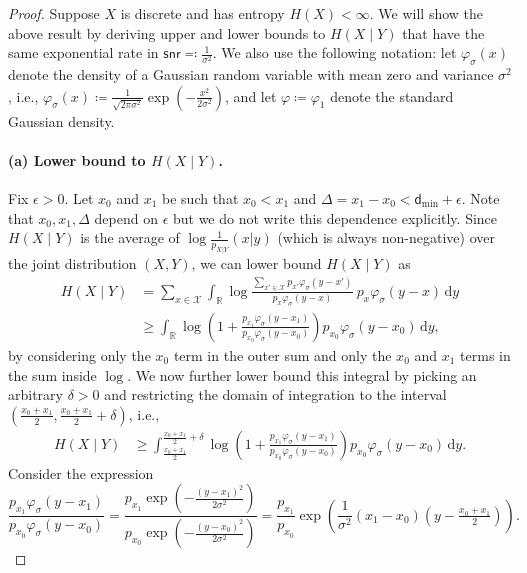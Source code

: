 \documentclass[10pt,a4paper]{amsart}
\newcommand{\bbR}{\mathbb{R}}
\newcommand{\calX}{\mathcal{X}}
\newcommand{\dmin}{\mathsf{d}_{\min}}
\newcommand{\intR}{\int_{\bbR}}
\newcommand{\snr}{\mathsf{snr}}
\renewcommand{\d}{\,\mathrm{d}}
\begin{document}
	\begin{proof}[Proof]
		Suppose $X$ is discrete and has entropy $H(X) < \infty$. We will show the above result by deriving upper and lower bounds to $H(X \mid Y)$ that have the same exponential rate in $\snr \eqqcolon \frac{1}{\sigma^2}$. 
		We also use the following notation: let $\varphi_{\sigma}(x)$ denote the density of a Gaussian random variable with mean zero and variance $\sigma^2$, i.e., $\varphi_{\sigma}(x) \coloneqq \frac{1}{\sqrt{2\pi\sigma^2}} \exp(-\frac{x^2}{2\sigma^2})$, and let $\varphi \coloneqq \varphi_1$ denote the standard Gaussian density.
		
		\paragraph{(a) Lower bound to $H(X \mid Y)$. } 
		Fix $\epsilon > 0$. 
		Let $x_0$ and $x_1$ be such that $x_0 < x_1$ and $\Delta = x_1 - x_0 < \dmin + \epsilon$. Note that $x_0,x_1,\Delta$ depend on $\epsilon$ but we do not write this dependence explicitly. Since $H(X \mid Y)$ is the average of $\log\frac1{p_{X|Y}}(x|y)$ (which is always non-negative) over the joint distribution $(X,Y)$, we can lower bound $H(X \mid Y)$ as
		\begin{align*}
			H(X \mid Y) &= \sum_{x \in \calX}  \intR \log \frac{\sum_{x' \in \calX} p_{x'} \varphi_{\sigma}(y-x')}{p_{x} \varphi_{\sigma}(y - x)}\ p_{x}\varphi_{\sigma}(y-x) \d y\\
			&\geq  \intR \log \left(1+\frac{ p_{x_1} \varphi_{\sigma}(y-x_1)}{p_{x_0} \varphi_{\sigma}(y - x_0)}\right) p_{x_0}\varphi_{\sigma}(y-x_0) \d y,
		\end{align*}
		by considering only the $x_0$ term in the outer sum and only the $x_0$ and $x_1$ terms in the sum inside $\log$. 
		We now further lower bound this integral by picking an arbitrary $\delta > 0$ and restricting the domain of integration to the interval $(\frac{x_0 + x_1}{2}, \frac{x_0 + x_1}{2}+\delta)$, i.e.,
		\begin{align*}
			H(X \mid Y) &\geq  \int_{\frac{x_0 + x_1}{2}}^{\frac{x_0 + x_1}{2}+\delta} \log \left(1+\frac{ p_{x_1} \varphi_{\sigma}(y-x_1)}{p_{x_0} \varphi_{\sigma}(y - x_0)}\right) p_{x_0}\varphi_{\sigma}(y-x_0) \d y.
		\end{align*}
		Consider the expression $$\frac{ p_{x_1} \varphi_{\sigma}(y-x_1)}{p_{x_0} \varphi_{\sigma}(y - x_0)} = \frac{ p_{x_1} \exp(-\frac{(y-x_1)^2}{2\sigma^2})}{p_{x_0} \exp(-\frac{(y-x_0)^2}{2\sigma^2})} = \frac{p_{x_1}}{p_{x_0}}\exp\left(\frac{1}{\sigma^2}(x_1-x_0)(y - \tfrac{x_0 + x_1}{2})\right).$$

\end{proof}
\end{document}
